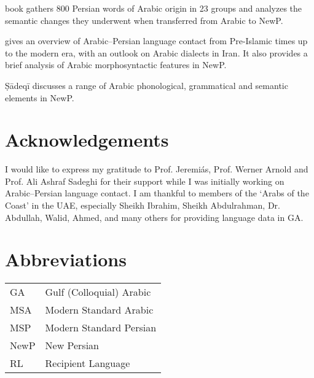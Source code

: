 \documentclass[output=paper]{langsci/langscibook}
\begin{document}
\citet{Asbaghi1987} book gathers 800 Persian words of Arabic origin in 23 groups and analyzes the semantic changes they underwent when transferred from Arabic to NewP.

\citet{Gazsi2011} gives an overview of Arabic–Persian language contact from Pre-Islamic times up to the modern era, with an outlook on Arabic dialects in Iran. It also provides a brief analysis of Arabic morphosyntactic features in NewP.

Ṣādeqī  discusses a range of Arabic phonological, grammatical and semantic elements in NewP.

\section*{Acknowledgements}

I would like to express my gratitude to Prof. Jeremiás, Prof. Werner Arnold and Prof. Ali Ashraf Sadeghi for their support while I was initially working on Arabic–Persian language contact. I am thankful to members of the ‘Arabs of the Coast’ in the UAE, especially Sheikh Ibrahim, Sheikh Abdulrahman, Dr. Abdullah, Walid, Ahmed, and many others for providing language data in GA.

\section*{Abbreviations}
\begin{tabularx}{.5\textwidth}{@{}lQ@{}}
GA & Gulf (Colloquial) Arabic\\
MSA &  Modern Standard Arabic\\
MSP  &  Modern Standard Persian\\
NewP   &  New Persian\\
RL &  Recipient Language \\
\end{tabularx}%
\end{document}
